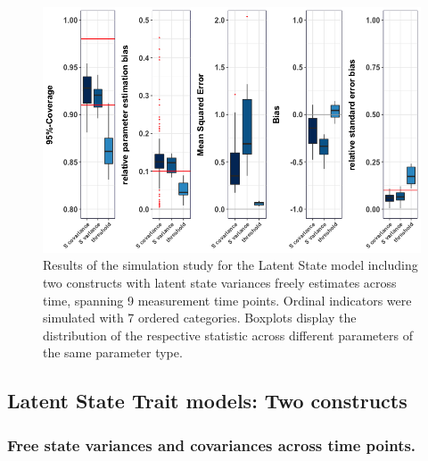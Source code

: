  \begin{figure}[H]
 \begin{adjustwidth}{-1cm}{-1cm}
    \begin{center}
  \includegraphics[width=1\textwidth]{Boxplot_Latent_State_2construcs_free.png}
   \end{center}
    \end{adjustwidth}
      \captionsetup{skip=10pt,width=1.05\textwidth}
\caption[Results LS free variance two constructs]{Results of the simulation study for the Latent State model including two constructs with latent state variances freely estimates across time, spanning 9 measurement time points.  Ordinal indicators were simulated with 7 ordered categories. Boxplots display the distribution of the respective statistic across different parameters of the same parameter type.}
\label{Fig: LS free}
\end{figure}

\subsection{Latent State Trait models: Two constructs}

 \subsubsection{Free state variances and covariances across time points.}
 
